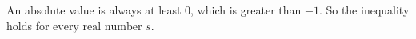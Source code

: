 An absolute value is always at least $0$, which is greater than $-1$. So the inequality holds for $\boxed{\text{every real number }s}$.
